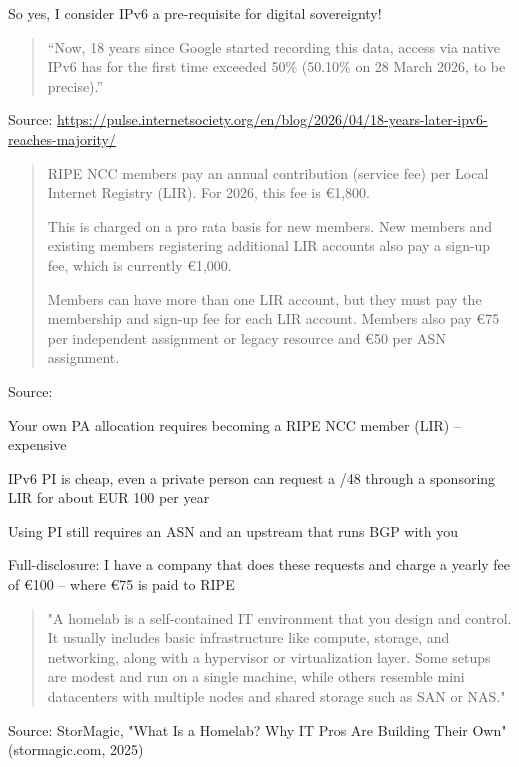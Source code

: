 \documentclass[Screen16to9,17pt]{foils}
\begin{document}
So yes, I consider IPv6 a pre-requisite for digital sovereignty!


\begin{quote}
``Now, 18 years since Google started recording this data, access via
native IPv6 has for the first time exceeded 50\% (50.10\% on 28 March
2026, to be precise).''
\end{quote}
Source: \url{https://pulse.internetsociety.org/en/blog/2026/04/18-years-later-ipv6-reaches-majority/}



\begin{quote}
RIPE NCC members pay an annual contribution (service fee) per Local Internet Registry (LIR). For 2026, this fee is €1,800.

This is charged on a pro rata basis for new members. New members and existing members registering additional LIR accounts also pay a sign-up fee, which is currently €1,000.

Members can have more than one LIR account, but they must pay the membership and sign-up fee for each LIR account. Members also pay €75 per independent assignment or legacy resource and €50 per ASN assignment.
\end{quote}
Source: 



\begin{list2}
\item Your own PA allocation requires becoming a RIPE NCC member (LIR) -- expensive
\item IPv6 PI is cheap, even a private person can request a /48 through a sponsoring LIR for about EUR 100 per year
\item Using PI still requires an ASN and an upstream that runs BGP with you
\end{list2}

Full-disclosure: I have a company that does these requests and charge a yearly fee of €100 -- where €75 is paid to RIPE


\begin{quote}
"A homelab is a self-contained IT environment that you design and control. It usually includes basic infrastructure like compute, storage, and networking, along with a hypervisor or virtualization layer. Some setups are modest and run on a single machine, while others resemble mini datacenters with multiple nodes and shared storage such as SAN or NAS."
\end{quote}
Source: StorMagic, "What Is a Homelab? Why IT Pros Are Building Their Own" (stormagic.com, 2025)
\end{document}
